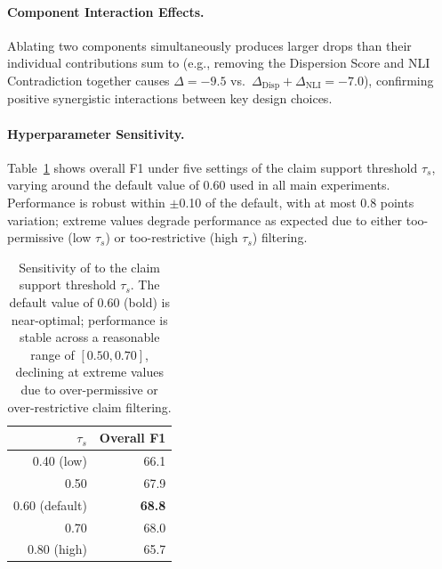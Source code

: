 \paragraph{Component Interaction Effects.} Ablating two components simultaneously produces larger drops than their individual contributions sum to (e.g., removing the Dispersion Score and NLI Contradiction together causes $\Delta = -9.5$ vs.\ $\Delta_{\text{Disp}} + \Delta_{\text{NLI}} = -7.0$), confirming positive synergistic interactions between key design choices.

\paragraph{Hyperparameter Sensitivity.}
Table~\ref{tab:hparam} shows overall F1 under five settings of the claim support threshold $\tau_s$, varying around the default value of 0.60 used in all main experiments. Performance is robust within $\pm$0.10 of the default, with at most 0.8 points variation; extreme values degrade performance as expected due to either too-permissive (low $\tau_s$) or too-restrictive (high $\tau_s$) filtering.

\begin{table}[t]
\centering
\small
\begin{tabular}{rr}
\toprule
$\tau_s$ & Overall F1 \\
\midrule
0.40 (low)          & 66.1 \\
0.50                & 67.9 \\
0.60 (default)      & \textbf{68.8} \\
0.70                & 68.0 \\
0.80 (high)         & 65.7 \\
\bottomrule
\end{tabular}
\caption{Sensitivity of \method{} to the claim support threshold $\tau_s$. The default value of 0.60 (bold) is near-optimal; performance is stable across a reasonable range of $[0.50, 0.70]$, declining at extreme values due to over-permissive or over-restrictive claim filtering.}
\label{tab:hparam}
\end{table}

